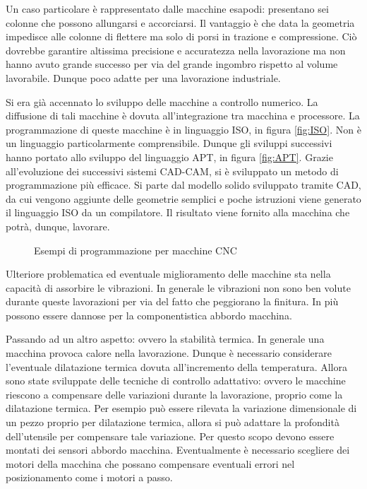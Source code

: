 Un caso particolare è rappresentato dalle macchine esapodi: presentano sei colonne che possono allungarsi e accorciarsi. Il vantaggio è che data la geometria impedisce alle colonne di flettere ma solo di porsi in trazione e compressione.
Ciò dovrebbe garantire altissima precisione e accuratezza nella lavorazione ma non hanno avuto grande successo per via del grande ingombro rispetto al volume lavorabile. Dunque poco adatte per una lavorazione industriale.

Si era già accennato lo sviluppo delle macchine a controllo numerico.
La diffusione di tali macchine è dovuta all'integrazione tra macchina e 
processore. La programmazione di queste macchine è in linguaggio ISO, in figura \ref{fig:ISO}.
Non è un linguaggio particolarmente comprensibile. Dunque gli sviluppi successivi hanno portato allo sviluppo del linguaggio APT, in figura \ref{fig:APT}.
Grazie all'evoluzione dei successivi sistemi CAD-CAM, si è sviluppato un metodo di programmazione più efficace. Si parte dal modello solido sviluppato tramite CAD, da cui vengono aggiunte delle geometrie semplici e poche istruzioni viene generato il linguaggio ISO da un compilatore.
Il risultato viene fornito alla macchina che potrà, dunque, lavorare.

\begin{figure}
\centering
{}\quad
{}
\caption{Esempi di programmazione per macchine CNC}
\label{fig:CNC}
\end{figure}

Ulteriore problematica ed eventuale miglioramento delle macchine sta nella capacità di assorbire le vibrazioni. In generale le vibrazioni non sono ben volute durante queste lavorazioni per via del fatto che peggiorano la finitura. In più possono essere dannose per la componentistica abbordo macchina.

Passando ad un altro aspetto: ovvero la stabilità termica.
In generale una macchina provoca calore nella lavorazione. Dunque è necessario considerare l'eventuale dilatazione termica dovuta all'incremento della temperatura.
Allora sono state sviluppate delle tecniche di controllo adattativo: ovvero le macchine riescono a compensare delle variazioni durante la lavorazione, proprio come la dilatazione termica. 
Per esempio può essere rilevata la variazione dimensionale di un pezzo proprio per dilatazione termica, allora si può adattare la profondità dell'utensile per compensare tale variazione. 
Per questo scopo devono essere montati dei sensori abbordo macchina.
Eventualmente è necessario scegliere dei motori della macchina che possano compensare eventuali errori nel posizionamento come i motori a passo.

